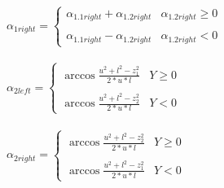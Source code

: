 \documentclass{article}
\begin{document}
\begin{center}
    \paragraph{}
    $\alpha_{1right} = \left\{
    \begin{array}{ll}
    \alpha_{1.1right} + \alpha_{1.2right} & \alpha_{1.2right} \ge 0 \\ \\
    \alpha_{1.1right} - \alpha_{1.2right} & \alpha_{1.2right} < 0
    \end{array}
    \right. $   

    \paragraph{}
    $\alpha_{2left} = \left\{
    \begin{array}{ll}
    \arccos \frac{u^2 + l^2 - z_1^2}{2 * u * l} & Y \ge 0 \\ \\
    \arccos \frac{u^2 + l^2 - z_2^2}{2 * u * l} & Y < 0
    \end{array}
    \right. $   

    \paragraph{}
    $\alpha_{2right} = \left\{
    \begin{array}{ll}
    \arccos \frac{u^2 + l^2 - z_2^2}{2 * u * l} & Y \ge 0 \\ \\
    \arccos \frac{u^2 + l^2 - z_1^2}{2 * u * l} & Y < 0
    \end{array}
    \right. $  
    \end{center}

    \paragraph{}




\end{document}
